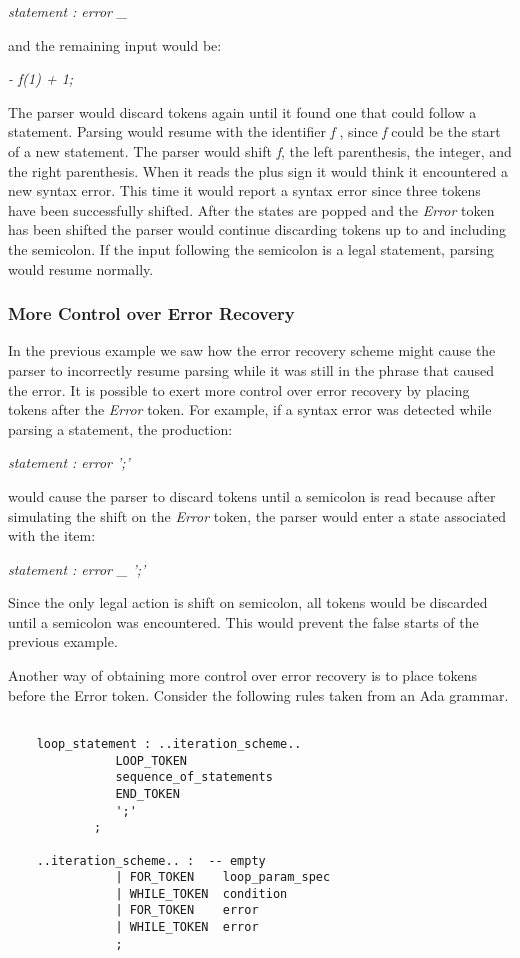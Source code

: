 \centerline{\it statement : error \_}

and the remaining input would be:

\centerline{\it - f(1) + 1;}

The parser would discard tokens again until it found one
that could follow a statement.  Parsing would resume with the identifier
{\it f}
, since
{\it f}
could be the start of a new statement.  The parser would shift
{\it f},
the left parenthesis, the integer, and the right parenthesis.  When it
reads the plus sign it would think it encountered a new
syntax error.  This time it would report
a syntax error since three tokens have been successfully shifted.  After
the states are popped and the
{\it Error}
token has been shifted the parser would continue discarding
tokens up to and including the semicolon.  If the input following the
semicolon is a legal statement, parsing would resume normally.
\subsubsection{More Control over Error Recovery}
In the previous example we saw how the error recovery scheme might
cause the parser to incorrectly resume parsing while it was still
in the phrase that caused the error.  It is possible to exert more
control over error recovery by placing tokens after the
{\it Error}
token.  For example, if a syntax error was detected while parsing
a statement, the production:

\centerline{\it statement : error ';'}

would cause the parser to discard tokens until a semicolon is read
because
after simulating the shift on
the
{\it Error}
token, the parser would enter a state associated with the item:

\centerline{\it statement : error \_ ';'}

Since the only legal action is shift on semicolon, all tokens would
be discarded until a semicolon was encountered.  This would prevent
the false starts of the previous example.

Another way of obtaining more control over error recovery is
to place tokens before the Error token.  Consider the following
rules taken from an Ada grammar.
\begin{verbatim}

	loop_statement : ..iteration_scheme..
			   LOOP_TOKEN
			   sequence_of_statements
			   END_TOKEN
			   ';'
			;

	..iteration_scheme.. :  -- empty
			   | FOR_TOKEN    loop_param_spec
			   | WHILE_TOKEN  condition
			   | FOR_TOKEN    error
			   | WHILE_TOKEN  error
			   ;

\end{verbatim}

